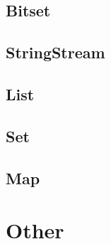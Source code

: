 \subsection{Bitset}


\subsection{StringStream}


\subsection{List}


\subsection{Set}


\subsection{Map}


\section{Other}






